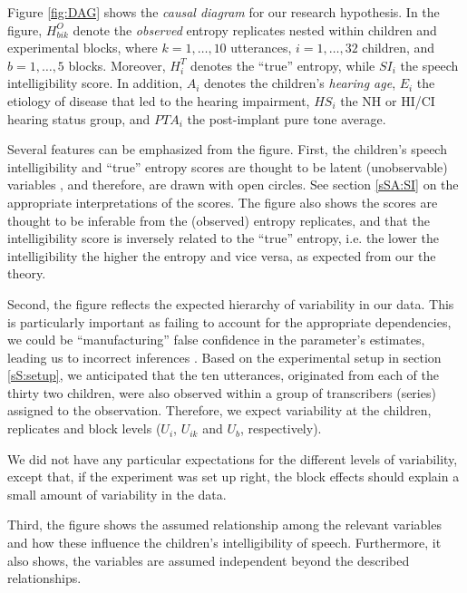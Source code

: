 Figure \ref{fig:DAG} shows the \textit{causal diagram} for our research hypothesis. In the figure, $H^{O}_{bik}$ denote the \textit{observed} entropy replicates nested within children and experimental blocks, where $k=1,\dots,10$ utterances, $i=1,\dots,32$ children, and $b=1,\dots,5$ blocks. Moreover, $H^{T}_{i}$ denotes the ``true'' entropy, while $SI_{i}$ the speech intelligibility score. In addition, $A_{i}$ denotes the children's \textit{hearing age}, $E_{i}$ the etiology of disease that led to the hearing impairment, $HS_{i}$ the NH or HI/CI hearing status group, and $PTA_{i}$ the post-implant pure tone average.

Several features can be emphasized from the figure. First, the children's speech intelligibility and ``true'' entropy scores are thought to be latent (unobservable) variables \cite{Everitt_1984}, and therefore, are drawn with open circles. See section \ref{sSA:SI} on the appropriate interpretations of the scores. The figure also shows the scores are thought to be inferable from the (observed) entropy replicates, and that the intelligibility score is inversely related to the ``true'' entropy, i.e. the lower the intelligibility the higher the entropy and vice versa, as expected from our the theory.

Second, the figure reflects the expected hierarchy of variability in our data. This is particularly important as failing to account for the appropriate dependencies, we could be ``manufacturing'' false confidence in the parameter's estimates, leading us to incorrect inferences \cite{McElreath_2020}. Based on the experimental setup in section \ref{sS:setup}, we anticipated that the ten utterances, originated from each of the thirty two children, were also observed within a group of transcribers (series) assigned to the observation. Therefore, we expect variability at the children, replicates and block levels ($U_{i}$, $U_{ik}$ and $U_{b}$, respectively). 

We did not have any particular expectations for the different levels of variability, except that, if the experiment was set up right, the block effects should explain a small amount of variability in the data.

Third, the figure shows the assumed relationship among the relevant variables and how these influence the children's intelligibility of speech. Furthermore, it also shows, the variables are assumed independent beyond the described relationships.

